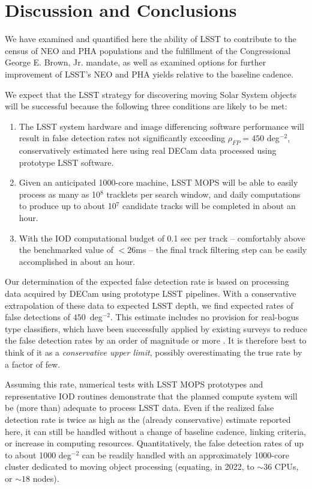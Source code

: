 

\section{Discussion and Conclusions\label{sec:discussion}}

We have examined and quantified here the ability of LSST to contribute to the census of NEO and PHA populations and the fulfillment of the Congressional George E. Brown, Jr. mandate, as well as examined options for further improvement of LSST's NEO and PHA yields relative to the baseline cadence.

We expect that the LSST strategy for discovering moving Solar System objects will be successful because the following three conditions are likely to be met:
\begin{enumerate}
	\item The LSST system hardware and image differencing software performance will result in false detection
	rates not significantly exceeding $\rho_{FP} =  450$ deg$^{-2}$, conservatively estimated here using real DECam data
	processed using prototype LSST software.
	\item Given an anticipated 1000-core machine, LSST MOPS will be able to easily process as many as
	10$^8$ tracklets per search window, and daily computations to produce up to about 10$^7$
	candidate tracks will be completed in about an hour.
	\item With the IOD computational budget of 0.1 sec per track -- comfortably above the benchmarked value of $<26$ms -- the final track filtering step can
	be easily accomplished in about an hour.
\end{enumerate}

Our determination of the expected false detection rate is based on processing data acquired by DECam using prototype LSST pipelines. With a conservative extrapolation of these data to expected LSST depth, we find expected rates of false detections of $450$~deg$^{-2}$. This estimate includes no provision for real-bogus type classifiers, which have been successfully applied by existing surveys to reduce the false detection rates by an order of magnitude or more \citep[e.g.][]{goldstein15}. It is therefore best to think of it as a {\it conservative upper limit}, possibly overestimating the true rate by a factor of few.

Assuming this rate, numerical tests with LSST MOPS prototypes and representative IOD routines demonstrate that the planned compute system will be (more than) adequate to
process LSST data. Even if the realized false detection rate is twice as high as
the (already conservative) estimate reported here, it can still be handled without a change of baseline cadence, linking criteria, or
increase in computing resources. Quantitatively, the false detection rates of up to about
1000 deg$^{-2}$ can be readily handled with an approximately 1000-core cluster dedicated to moving object processing (equating, in 2022, to $\sim 36$ CPUs, or $\sim 18$ nodes).


